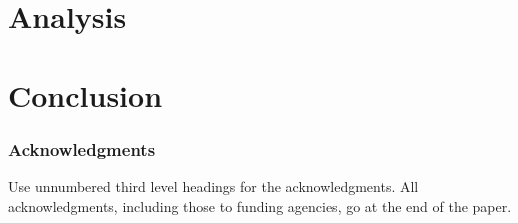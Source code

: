 \documentclass[]{article} %
\begin{document}
\section{Analysis}


\section{Conclusion}



\subsubsection*{Acknowledgments}

Use unnumbered third level headings for the acknowledgments. All
acknowledgments, including those to funding agencies, go at the end of the paper.


\end{document}
